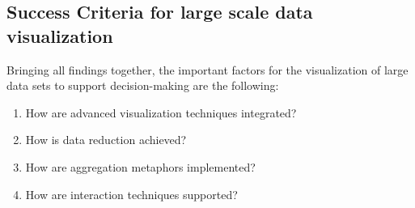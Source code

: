 \subsection{Success Criteria for large scale data visualization}\label{success}
Bringing all findings together, the important factors for the visualization of large data sets to support decision-making are the following: 
\begin{enumerate}[noitemsep]
\item How are advanced visualization techniques integrated? 
\item How is data reduction achieved? 
\item How are aggregation metaphors implemented? 
\item How are interaction techniques supported?
\end{enumerate}

